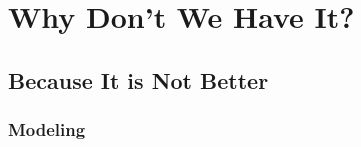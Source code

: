
\chapter[Why Not?]{Why Don't We Have It?}\label{chap:no-better-tax}




\section{Because It is Not Better}





\subsection{Modeling}


